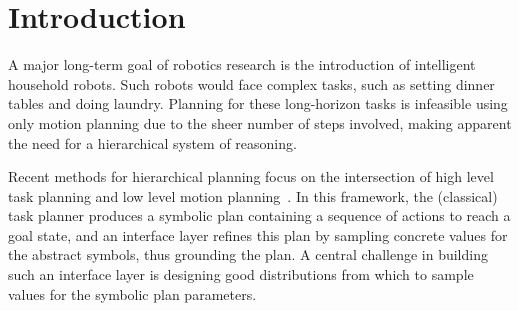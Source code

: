 \section{Introduction}
A major long-term goal of robotics research is the introduction of intelligent household robots.
Such robots would face complex tasks, such as setting
dinner tables and doing laundry. Planning for these long-horizon tasks is infeasible
using only motion planning due to the sheer number of steps involved, making apparent the need
for a hierarchical system of reasoning.

Recent methods for hierarchical planning focus on the intersection of high level task planning
and low level motion planning~\cite{srivastava2014combined, kaelbling2011hierarchical,
lagriffoul2014orientation}. In this framework, the (classical) task planner produces
a symbolic plan containing a sequence of actions to reach a goal
state, and an interface layer refines this plan by sampling concrete values for
the abstract symbols, thus grounding the plan. A central challenge in building such
an interface layer is designing good distributions from which to sample
values for the symbolic plan parameters.

